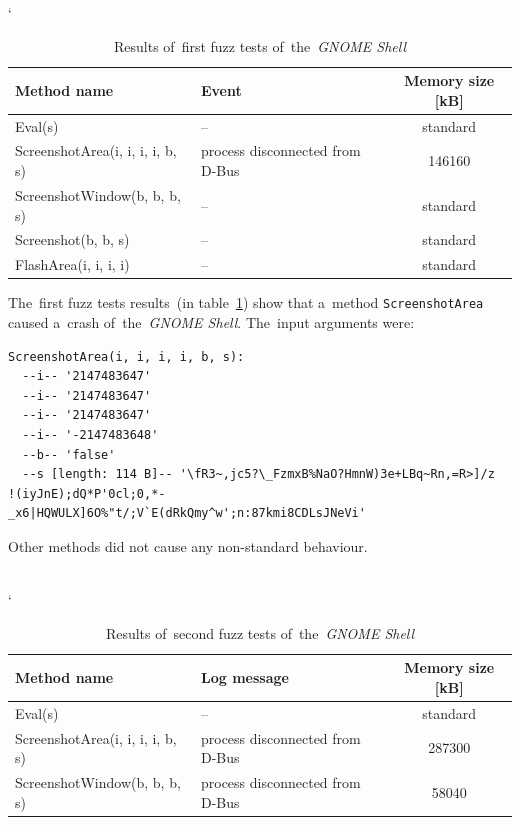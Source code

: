 \FloatBarrier
\begin{table}[h!]
\catcode`
\caption{Results of~first fuzz tests of~the~\emph{GNOME Shell}}
\label{tab:tab2}
\begin{center}
	\begin{tabular}{| l | l | c |}
	\hline
	\textbf{Method name} & \textbf{Event} & \textbf{Memory size [kB]} \\ \hline
	Eval(s) & -- & standard \\ \hline
	ScreenshotArea(i, i, i, i, b, s) & process disconnected from D-Bus & 146160 \\ \hline
	ScreenshotWindow(b, b, b, s) & -- & standard \\ \hline
	Screenshot(b, b, s) & -- & standard \\
	FlashArea(i, i, i, i) & -- & standard \\
	\hline
	\end{tabular}
\end{center}
\end{table}
\FloatBarrier


The~first fuzz tests results~(in table~\ref{tab:tab2}) show that a~method
\texttt{ScreenshotArea} caused a~crash of~the~\emph{GNOME Shell}. The~input
arguments were:
\begin{verbatim}
ScreenshotArea(i, i, i, i, b, s):
  --i-- '2147483647'
  --i-- '2147483647'
  --i-- '2147483647'
  --i-- '-2147483648'
  --b-- 'false'
  --s [length: 114 B]-- '\fR3~,jc5?\_FzmxB%NaO?HmnW)3e+LBq~Rn,=R>]/z
!(iyJnE);dQ*P'0cl;0,*-_x6|HQWULX]6O%"t/;V`E(dRkQmy^w';n:87kmi8CDLsJNeVi'
\end{verbatim}
Other methods did not cause any non-standard behaviour.\\\\


\FloatBarrier
\begin{table}[!h]
\catcode`
\caption{Results of~second fuzz tests of~the~\emph{GNOME Shell}}
\label{tab:tab3}
\begin{center}
	\begin{tabular}{| l | l | c |}
	\hline
	\textbf{Method name} & \textbf{Log message} & \textbf{Memory size [kB]} \\ \hline
	Eval(s) & -- & standard \\ \hline
	ScreenshotArea(i, i, i, i, b, s) & process disconnected from D-Bus & 287300 \\ \hline
	ScreenshotWindow(b, b, b, s) & process disconnected from D-Bus & 58040 \\
	\hline
	\end{tabular}
\end{center}
\end{table}
\FloatBarrier


